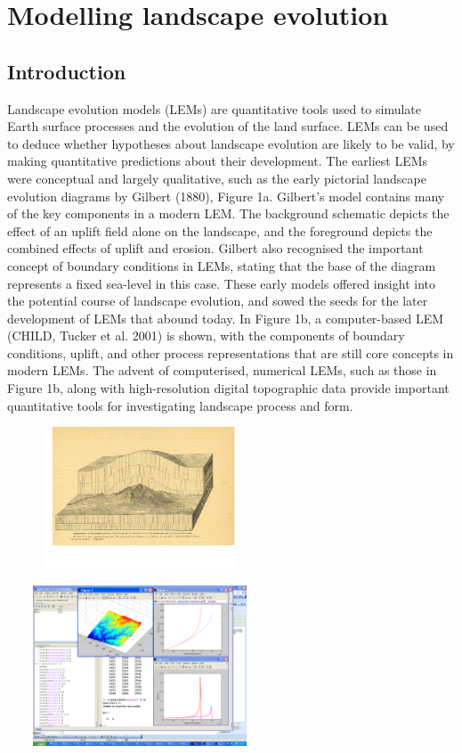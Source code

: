 \chapter{Modelling landscape evolution}
\label{LEMs}

\section{Introduction}
Landscape evolution models (LEMs) are quantitative tools used to simulate Earth surface processes and the evolution of the land surface. LEMs can be used to deduce whether hypotheses about landscape evolution are likely to be valid, by making quantitative predictions about their development. The earliest LEMs were conceptual and largely qualitative, such as the early pictorial landscape evolution diagrams by Gilbert (1880), Figure 1a. Gilbert’s model contains many of the key components in a modern LEM. The background schematic depicts the effect of an uplift field alone on the landscape, and the foreground depicts the combined effects of uplift and erosion. Gilbert also recognised the important concept of boundary conditions in LEMs, stating that the base of the diagram represents a fixed sea-level in this case.  These early models offered insight into the potential course of landscape evolution, and sowed the seeds for the later development of LEMs that abound today. In Figure 1b, a computer-based LEM (CHILD, Tucker et al. 2001) is shown, with the components of boundary conditions, uplift, and other process representations that are still core concepts in modern LEMs. The advent of computerised, numerical LEMs, such as those in Figure 1b, along with high-resolution digital topographic data provide important quantitative tools for investigating landscape process and form. 

\includegraphics[width=7.86cm,height=4.217cm]{LEMFinalRevisedmanuscriptDAVFinalrevisions-img/LEMFinalRevisedmanuscriptDAVFinalrevisions-img001.png} 

\includegraphics[width=7.883cm,height=4.768cm]{LEMFinalRevisedmanuscriptDAVFinalrevisions-img/LEMFinalRevisedmanuscriptDAVFinalrevisions-img002.png} 

